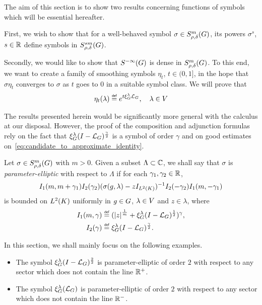 The aim of this section is to show two results concerning functions of symbols which will be essential hereafter.

First, we wish to show that for a well-behaved symbol $\sigma \in S^{m}_{\rho, \delta}(G)$,
its powers $\sigma^s$, $s \in \mathbb{R}$ define symbols in $S^{s m}_{\rho, \delta}(G)$.

Secondly, we would like to show that ${S^{-\infty} (G)}$ is dense in $S^{m}_{\rho, \delta}(G)$.
To this end, we want to create a family of smoothing symbols $\eta_t$, $t \in (0, 1]$, in the hope
that $\sigma \eta_t$ converges to $\sigma$ as $t$ goes to $0$ in a suitable symbol class.
We will prove that
\begin{align}
    \eta_t(\lambda) \defeq \e^{t \Rep \lambda \Laplacian},
    \quad \lambda \in \VectorSpace
    \label{eq:candidate_to_approximate_identity}
\end{align}

The results presented herein would be significantly more general with the calculus at our disposal.
However, the proof of the composition and adjunction formulas rely on the fact that $\xi^{\lambda}_{G} (I - {\mathcal{L}_{G}})^\frac{\gamma}{2}$ is a symbol of order $\gamma$
and on good estimates on~\eqref{eq:candidate_to_approximate_identity}.

\begin{definition}
    Let $\sigma \in S^{m}_{\rho, \delta}(G)$ with $m > 0$.
    Given a subset $\Lambda \subset \mathbb{C}$,
    we shall say that $\sigma$ is \emph{parameter-elliptic} with respect to $\Lambda$
    if for each $\gamma_1, \gamma_2 \in \mathbb{R}$,
    \begin{align*}
        I_1(m, m + \gamma_1)
        I_2(\gamma_2)
        (\sigma(g, \lambda) - z {I_{{L^{2} (K)}}})^{-1}
        I_2(-\gamma_2)
        I_1(m, -\gamma_1)
    \end{align*}
    is bounded on ${L^{2} (K)}$ uniformly in $g \in G$, $\lambda \in V$ and $z \in \lambda$,
    where
    \begin{align}
        I_1(m, \gamma) &\defeq (\abs z^{\frac 1 m} + \Rep \lambda \BesselPotential 1)^\gamma,\\
        I_2(\gamma) &\defeq \Rep \lambda \BesselPotential \gamma.
        \label{eq:operators_for_parameter-ellipticity}
    \end{align}
\end{definition}

\begin{example}
    In this section,
    we shall mainly focus on the following examples.

    \begin{itemize}
        \item The symbol $\xi^{\lambda}_{G} (I - {\mathcal{L}_{G}})^\frac{2}{2}$ is parameter-elliptic of order $2$ with respect to any sector which does not contain the line $\mathbb{R}^+$.
        \item The symbol $\xi^{\lambda}_{G} ({\mathcal{L}_{G}})$ is parameter-elliptic of order $2$ with respect to any sector which does not contain the line $\mathbb{R}^-$.
    \end{itemize}
\end{example}


